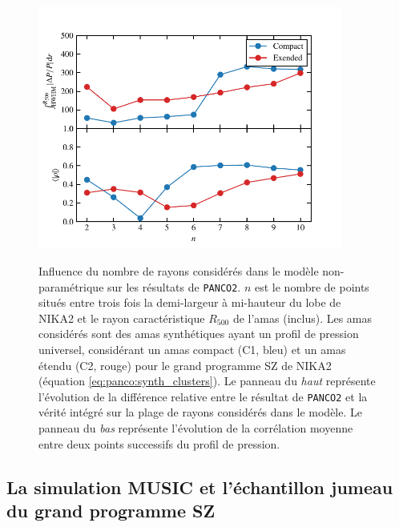 \begin{figure}
    \caption{%
        Influence du nombre de rayons considérés dans le modèle non-paramétrique sur les résultats de \texttt{PANCO2}.
        $n$ est le nombre de points situés entre trois fois la demi-largeur à mi-hauteur du lobe de NIKA2 et le rayon caractéristique $R_{500}$ de l'amas (inclus).
        Les amas considérés sont des amas synthétiques ayant un profil de pression universel, considérant un amas compact (C1, bleu) et un amas étendu (C2, rouge) pour le grand programme SZ de NIKA2 (équation \ref{eq:panco:synth_clusters}).
        Le panneau du \textit{haut} représente l'évolution de la différence relative entre le résultat de \texttt{PANCO2} et la vérité intégré sur la plage de rayons considérés dans le modèle.
        Le panneau du \textit{bas} représente l'évolution de la corrélation moyenne entre deux points successifs du profil de pression.
    }
    \includegraphics[height=8cm]{Figures/Chap_panco/evol.pdf}
    \label{fig:panco:binning}
\end{figure}

\subsection{La simulation MUSIC et l'échantillon jumeau du grand programme SZ}
\label{sec:panco:music}

